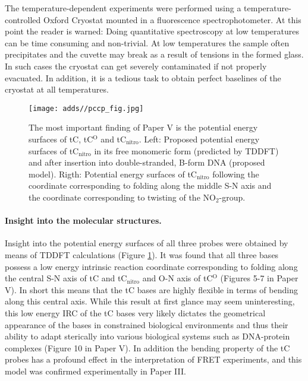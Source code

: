 The temperature-dependent experiments were performed using a temperature-controlled Oxford Cryostat mounted in a fluorescence spectrophotometer. At this point the reader is warned: Doing quantitative spectroscopy at low temperatures can be time consuming and non-trivial. At low temperatures the sample often precipitates and the cuvette may break as a result of tensions in the formed glass. In such cases the cryostat can get severely contaminated if not properly evacuated. In addition, it is a tedious task to obtain perfect baselines of the cryostat at all temperatures.

\begin{figure}
    \centering
        \texttt{[image: adds//pccp\_fig.jpg]}
    \captionsetup{width=.95\textwidth}
    \caption{The most important finding of Paper V is the potential energy surfaces of tC, tC$^\mathrm{O}$ and tC$_\mathrm{nitro}$. Left: Proposed potential energy surfaces of tC$_\mathrm{nitro}$ in its free monomeric form (predicted by TDDFT) and after insertion into double-stranded, B-form DNA (proposed model). Rigth: Potential energy surfaces of tC$_\mathrm{nitro}$ following the coordinate corresponding to folding along the middle S-N axis and the coordinate corresponding to twisting of the NO$_2$-group.}
    \label{Fig:chap_Papers_PCCP}
\end{figure}

 \paragraph{Insight into the molecular structures.} Insight into the potential energy surfaces of all three probes were obtained by means of TDDFT calculations (Figure \ref{Fig:chap_Papers_PCCP}). It was found that all three bases possess a low energy intrinsic reaction coordinate corresponding to folding along the central S-N axis of tC and tC$_\mathrm{nitro}$ and O-N axis of tC$^\mathrm{O}$ (Figures 5-7 in Paper V). In short this means that the tC bases are highly flexible in terms of bending along this central axis. While this result at first glance may seem uninteresting, this low energy IRC of the tC bases very likely dictates the geometrical appearance of the bases in constrained biological environments and thus their ability to adapt sterically into various biological systems such as DNA-protein complexes (Figure 10 in Paper V). In addition the bending property of the tC probes has a profound effect in the interpretation of FRET experiments, and this model was confirmed experimentally in Paper III.

